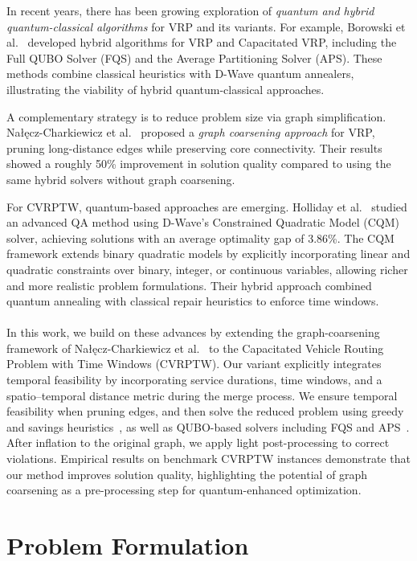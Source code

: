\documentclass[conference]{IEEEtran}
\begin{document}
In recent years, there has been growing exploration of \emph{quantum and hybrid quantum-classical algorithms} for VRP and its variants. For example, Borowski et al.~\cite{borowski2020} developed hybrid algorithms for VRP and Capacitated VRP, including the Full QUBO Solver (FQS) and the Average Partitioning Solver (APS). These methods combine classical heuristics with D-Wave quantum annealers, illustrating the viability of hybrid quantum-classical approaches. 

A complementary strategy is to reduce problem size via graph simplification. Nałęcz-Charkiewicz et al.~\cite{nalecz2025} proposed a \emph{graph coarsening approach} for VRP, pruning long-distance edges while preserving core connectivity. Their results showed a roughly 50\%  improvement in solution quality compared to using the same hybrid solvers without graph coarsening.

For CVRPTW, quantum-based approaches are emerging. Holliday et al.~\cite{holliday2025} studied an advanced QA method using D-Wave’s Constrained Quadratic Model (CQM) solver, achieving solutions with an average optimality gap of 3.86\%. The CQM framework extends binary quadratic models by explicitly incorporating linear and quadratic constraints over binary, integer, or continuous variables, allowing richer and more realistic problem formulations.\cite{benson2023cqm} Their hybrid approach combined quantum annealing with classical repair heuristics to enforce time windows. 
\\ \\
In this work, we build on these advances by extending the graph-coarsening framework of Nałęcz-Charkiewicz et al.~\cite{nalecz2025} to the Capacitated Vehicle Routing Problem with Time Windows (CVRPTW). Our variant explicitly integrates temporal feasibility by incorporating service durations, time windows, and a spatio–temporal distance metric during the merge process. We ensure temporal feasibility when pruning edges, and then solve the reduced problem using greedy \cite{cormen2009introduction} and savings heuristics~\cite{clarke1964}, as well as QUBO-based solvers including FQS and APS~\cite{borowski2020}. After inflation to the original graph, we apply light post-processing to correct violations. Empirical results on benchmark CVRPTW instances demonstrate that our method improves solution quality, highlighting the potential of graph coarsening as a pre-processing step for quantum-enhanced optimization.


\section{Problem Formulation}
\end{document}
